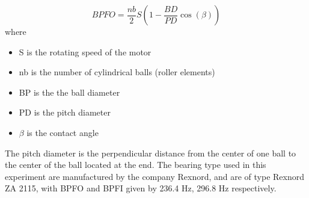 \documentclass[../Main/thesis.tex]{subfiles}
\begin{document}
\begin{equation}\label{eq:bpfo}
BPFO = \frac{nb}{2}S\left( 1 -  \frac{BD}{PD}\cos(\beta)  \right)
\end{equation}
where 
\begin{itemize}
\item S is the rotating speed of the motor
\item nb is the number of cylindrical balls (roller elements)
\item BP is the the ball diameter
\item PD is the pitch diameter
\item $\beta$ is the contact angle
\end{itemize}
The pitch diameter is the perpendicular distance from the center of one ball to the center of the ball located at the end.
The bearing type used in this experiment are manufactured by the company Rexnord, and are of type Rexnord ZA 2115, with BPFO and BPFI given by 236.4 Hz, 296.8 Hz respectively. 
\end{document}
